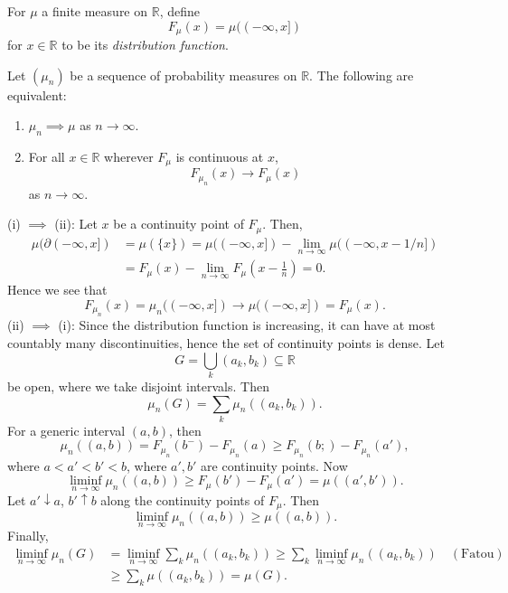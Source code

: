 \documentclass[12pt]{article}
\begin{document}
For $\mu$ a finite measure on $\mathbb{R}$, define
\[
	F_\mu(x) = \mu((-\infty, x])
\]
for $x \in \mathbb{R}$ to be its \emph{distribution function}.

\begin{proposition}
	Let $(\mu_n)$ be a sequence of probability measures on $\mathbb{R}$. The following are equivalent:
	\begin{enumerate}[\normalfont(i)]
		\item $\mu_n \implies \mu$ as $n \to \infty$.
		\item For all $x \in \mathbb{R}$ wherever $F_\mu$ is continuous at $x$,
			\[
			F_{\mu_n}(x) \to F_\mu(x)
			\]
			as $n \to \infty$.
	\end{enumerate}
\end{proposition}

\begin{proofbox}
	

	(i) $\implies$ (ii): Let $x$ be a continuity point of $F_\mu$. Then,
	\begin{align*}
		\mu(\partial(-\infty, x]) &= \mu(\{x\}) = \mu((-\infty, x]) - \lim_{n \to \infty} \mu((-\infty, x - 1/n]) \\
					  &= F_\mu(x) - \lim_{n \to \infty} F_\mu\left( x - \frac{1}{n} \right) = 0.
	\end{align*}
	Hence we see that
	\[
		F_{\mu_n}(x) = \mu_n((-\infty, x]) \to \mu((-\infty, x]) = F_\mu(x).
	\]
	(ii) $\implies$ (i): Since the distribution function is increasing, it can have at most countably many discontinuities, hence the set of continuity points is dense. Let
	\[
	G = \bigcup_k(a_k, b_k) \subseteq \mathbb{R}
	\]
	be open, where we take disjoint intervals. Then
	\[
	\mu_n(G) = \sum_k \mu_n((a_k, b_k)).
	\]
	For a generic interval $(a, b)$, then
	\[
	\mu_n((a, b)) = F_{\mu_n}(b^-) - F_{\mu_n}(a) \geq F_{\mu_n}(b;) - F_{\mu_n}(a'),
	\]
	where $a < a' < b' < b$, where $a', b'$ are continuity points. Now
	\[
	\liminf_{n \to \infty} \mu_n((a, b)) \geq F_\mu(b') - F_{\mu}(a') = \mu((a', b')).
	\]
	Let $a' \downarrow a$, $b' \uparrow b$ along the continuity points of $F_\mu$. Then
	\[
	\liminf_{n \to \infty} \mu_n((a, b)) \geq \mu((a, b)).
	\]
	Finally,
	\begin{align*}
		\liminf_{n \to \infty}\mu_n(G) &= \liminf_{n \to \infty} \sum_k \mu_n((a_k, b_k)) \geq \sum_k \liminf_{n \to \infty} \mu_n((a_k, b_k)) \quad(\text{Fatou}) \\
					       &\geq \sum_k \mu((a_k, b_k)) = \mu(G).
	\end{align*}
\end{proofbox}
\end{document}
